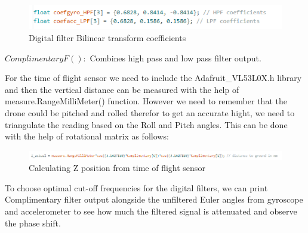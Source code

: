 \begin{flushleft}
\begin{flushleft}
\begin{flushleft}
\begin{flushleft}
\begin{figure}[H]
    \begin{center}
    \includegraphics[scale = 0.85]{pictures/IMU/HPF_LPF_coefff.png}
    \end{center}
    \caption{Digital filter Bilinear transform coefficients}
    \label{fig:my_label}
\end{figure}

\begin{flushleft}
$ComplimentaryF():$\newline
Combines high pass and low pass filter output.

For the time of flight sensor we need to include the Adafruit_VL53L0X.h library and then the vertical distance can be measured with the help of measure.RangeMilliMeter() function. However we need to remember that the drone could be pitched and rolled therefor to get an accurate hight, we need to triangulate the reading based on the Roll and Pitch angles. This can be done with the help of rotational matrix as follows:

\begin{figure}[H]
    \begin{center}
    \includegraphics[scale = 0.85]{pictures/IMU/Z_actual_trinagulation.png}
    \end{center}
    \caption{Calculating Z position from time of flight sensor}
    \label{fig:my_label}
\end{figure}


\begin{flushleft}
    To choose optimal cut-off frequencies for the digital filters, we can print Complimentary filter output alongside the unfiltered Euler angles from gyroscope and accelerometer to see how much the filtered signal is attenuated and observe the phase shift. 
\end{flushleft}


\end{flushleft}
\end{flushleft}
\end{flushleft}
\end{flushleft}
\end{flushleft}
